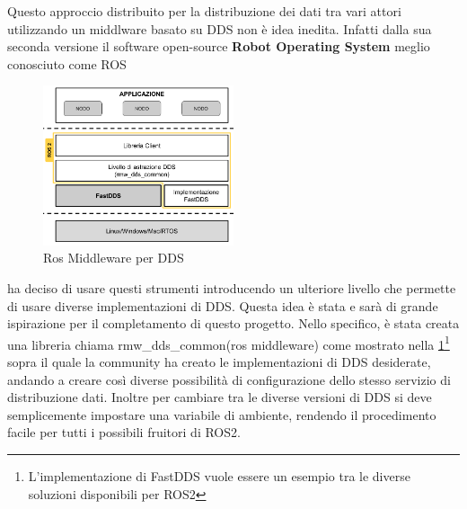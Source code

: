 Questo approccio distribuito per la distribuzione dei dati tra vari attori utilizzando un middlware basato su DDS non è idea inedita. Infatti dalla sua seconda versione il software open-source \textbf{Robot Operating System} meglio conosciuto come ROS
\begin{figure}
  \includegraphics[width=0.5\textwidth]{img/ROS_MW.png}
  \caption{Ros Middleware per DDS} 
  \label{fig:rmw_dds_common}
\end{figure}
ha deciso di usare questi strumenti introducendo un ulteriore livello che permette di usare diverse implementazioni di DDS. Questa idea è stata e sarà di grande ispirazione per il completamento di questo progetto.
Nello specifico, è stata creata una libreria chiama rmw\_dds\_common(ros middleware) come mostrato nella \ref{fig:rmw_dds_common}\footnote{L'implementazione di FastDDS vuole essere un esempio tra le diverse soluzioni disponibili per ROS2} sopra il quale la community ha creato le implementazioni di DDS desiderate, andando a creare così diverse possibilità di configurazione dello stesso servizio di distribuzione dati.
Inoltre per cambiare tra le diverse versioni di DDS si deve semplicemente impostare una variabile di ambiente, rendendo il procedimento facile per tutti i possibili fruitori di ROS2. 

